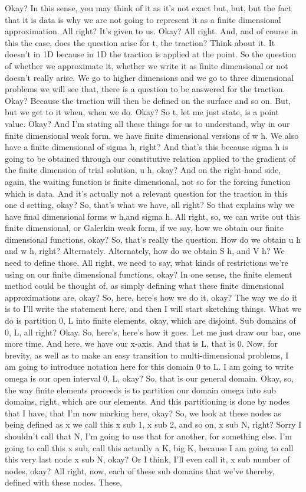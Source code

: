 \documentclass[10pt]{article}
\begin{document}
Okay? In this sense, you may think of it as it's not exact but, but, but the fact that it is data is why we are not going to represent it as a finite dimensional approximation. All right? It's given to us. Okay? All right. And, and of course in this the case, does the question arise for t, the traction? Think about it. It doesn't in 1D because in 1D the traction is applied at the point. So the question of whether we approximate it, whether we write it as finite dimensional or not doesn't really arise. We go to higher dimensions and we go to three dimensional problems we will see that, there is a question to be answered for the traction. Okay? Because the traction will then be defined on the surface and so on. But, but we get to it when, when we do. Okay? So t, let me just state, is a point value. Okay? And I'm stating all these things for us to understand, why in our finite dimensional weak form, we have finite dimensional versions of w h. We also have a finite dimensional of sigma h, right? And that's this because sigma h is going to be obtained through our constitutive relation applied to the gradient of the finite dimension of trial solution, u h, okay? And on the right-hand side, again, the waiting function is finite dimensional, not so for the forcing function which is data. And it's actually not a relevant question for the traction in this one d setting, okay? So, that's what we have, all right? So that explains why we have final dimensional forms w h,and sigma h. All right, so, we can write out this finite dimensional, or Galerkin weak form, if we say, how we obtain our finite dimensional functions, okay? So, that's really the question. How do we obtain u h and w h, right? Alternately. Alternately, how do we obtain S h, and V h? We need to define those. All right, we need to say, what kinds of restrictions we're using on our finite dimensional functions, okay? In one sense, the finite element method could be thought of, as simply defining what these finite dimensional approximations are, okay? So, here, here's how we do it, okay? The way we do it is to I'll write the statement here, and then I will start sketching things. What we do is partition 0, L into finite elements, okay, which are disjoint. Sub domains of 0, L, all right? Okay. So, here's, here's how it goes. Let me just draw our bar, one more time. And here, we have our x-axis. And that is L, that is 0. Now, for brevity, as well as to make an easy transition to multi-dimensional problems, I am going to introduce notation here for this domain 0 to L. I am going to write omega is our open interval 0, L, okay? So, that is our general domain. Okay, so, the way finite elements proceeds is to partition our domain omega into sub domains, right, which are our elements. And this partitioning is done by nodes that I have, that I'm now marking here, okay? So, we look at these nodes as being defined as x we call this x sub 1, x sub 2, and so on, x sub N, right? Sorry I shouldn't call that N, I'm going to use that for another, for something else. I'm going to call this x sub, call this actually a K, big K, because I am going to call this very last node x sub N, okay? Or I think, I'll even call it, x sub number of nodes, okay? All right, now, each of these sub domains that we've thereby, defined with these nodes. These, 
\end{document}
